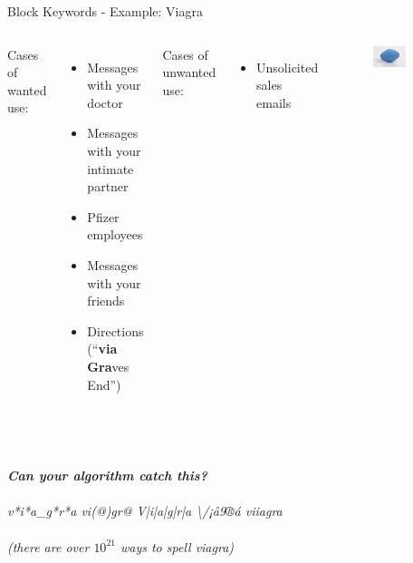 \documentclass[nobackground,dvipsnames,table]{beamer}
\begin{document}
\begin{frame}{Block Keywords - Example: Viagra}
    \begin{columns}[T]
            Cases of wanted use:
            \begin{itemize}
                \item Messages with your doctor
                \item Messages with your intimate partner
                \item Pfizer employees
                \item Messages with your friends 
                \item Directions (“\textbf{via Gra}ves End”)
            \end{itemize}
            Cases of unwanted use:
            \begin{itemize}
                \item Unsolicited sales emails
            \end{itemize}
            \begin{figure}
                \includegraphics[width=0.6\textwidth]{viagra}
            \end{figure}
    \end{columns}\\~\\
    \centering
    \textit{\textbf{Can your algorithm catch this?} \\~\\
    v*i*a_g*r*a     vi(@)gr@		V|i|a|g|r|a	  \textbackslash/¡å9®á		viiagra\\~\\
    (there are over $10^{21}$ ways to spell viagra)}
\end{frame}
\end{document}

